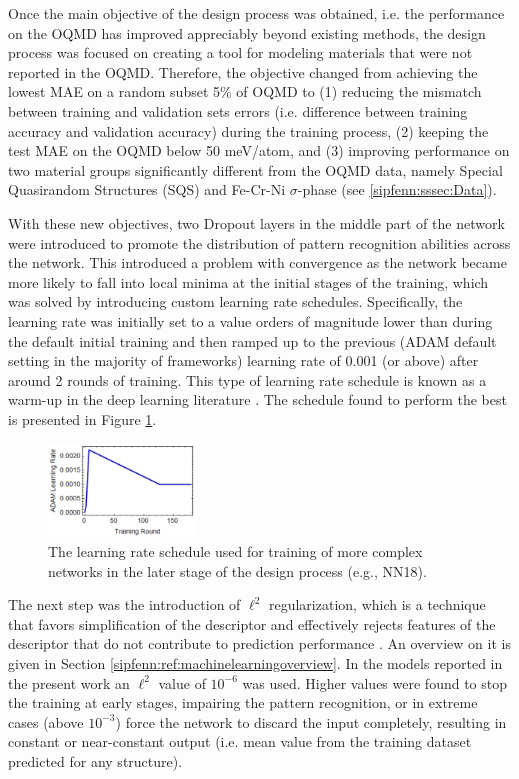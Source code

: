 Once the main objective of the design process was obtained, i.e. the performance on the OQMD has improved appreciably beyond existing methods, the design process was focused on creating a tool for modeling materials that were not reported in the OQMD. Therefore, the objective changed from achieving the lowest MAE on a random subset 5\% of OQMD to (1) reducing the mismatch between training and validation sets errors (i.e. difference between training accuracy and validation accuracy) during the training process, (2) keeping the test MAE on the OQMD below 50 meV/atom, and (3) improving performance on two material groups significantly different from the OQMD data, namely Special Quasirandom Structures (SQS) and Fe-Cr-Ni $\sigma$-phase (see \ref{sipfenn:sssec:Data}).

With these new objectives, two Dropout layers in the middle part of the network were introduced to promote the distribution of pattern recognition abilities across the network. \cite{Srivastava2014Dropout:Overfitting} This introduced a problem with convergence as the network became more likely to fall into local minima at the initial stages of the training, which was solved by introducing custom learning rate schedules. Specifically, the learning rate was initially set to a value orders of magnitude lower than during the default initial training and then ramped up to the previous (ADAM default setting in the majority of frameworks) learning rate of 0.001 (or above) after around 2 rounds of training. This type of learning rate schedule is known as a warm-up in the deep learning literature \cite{gotmare2018closer}. The schedule found to perform the best is presented in Figure \ref{sipfenn:fig:learningrate}.

\begin{figure}[H]
\centering
    \includegraphics[width=0.35\textwidth]{sipfenn/nn18_learningrate_linonly.png}
    \caption{The learning rate schedule used for training of more complex networks in the later stage of the design process (e.g., NN18).}
    \label{sipfenn:fig:learningrate}
\end{figure}


The next step was the introduction of $\ell^2$ regularization, which is a technique that favors simplification of the descriptor and effectively rejects features of the descriptor that do not contribute to prediction performance \cite{L2Regularization}. An overview on it is given in Section \ref{sipfenn:ref:machinelearningoverview}. In the models reported in the present work an $\ell^2$ value of $10^{-6}$ was used. Higher values were found to stop the training at early stages, impairing the pattern recognition, or in extreme cases (above $10^{-3}$) force the network to discard the input completely, resulting in constant or near-constant output (i.e. mean value from the training dataset predicted for any structure).

